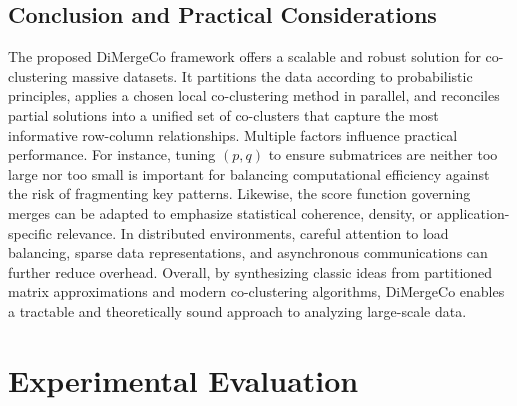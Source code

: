 \documentclass[journal]{IEEEtran}
\begin{document}
\subsection{Conclusion and Practical Considerations}

The proposed DiMergeCo framework offers a scalable and robust solution for co-clustering massive datasets. It partitions the data according to probabilistic principles, applies a chosen local co-clustering method in parallel, and reconciles partial solutions into a unified set of co-clusters that capture the most informative row-column relationships. Multiple factors influence practical performance. For instance, tuning $(p, q)$ to ensure submatrices are neither too large nor too small is important for balancing computational efficiency against the risk of fragmenting key patterns. Likewise, the score function governing merges can be adapted to emphasize statistical coherence, density, or application-specific relevance. In distributed environments, careful attention to load balancing, sparse data representations, and asynchronous communications can further reduce overhead. Overall, by synthesizing classic ideas from partitioned matrix approximations and modern co-clustering algorithms, DiMergeCo enables a tractable and theoretically sound approach to analyzing large-scale data.

\section{Experimental Evaluation}
\label{sec:experiment}
\end{document}
